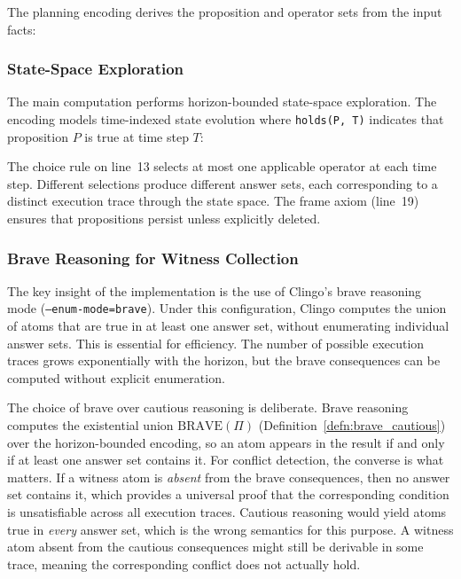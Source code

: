 The planning encoding derives the proposition and operator sets from the input facts:



\subsubsection{State-Space Exploration}

The main computation performs horizon-bounded state-space exploration. The encoding models time-indexed state evolution where \texttt{holds(P, T)} indicates that proposition $P$ is true at time step $T$:



The choice rule on line~13 selects at most one applicable operator at each time step. Different selections produce different answer sets, each corresponding to a distinct execution trace through the state space. The frame axiom (line~19) ensures that propositions persist unless explicitly deleted.

\subsubsection{Brave Reasoning for Witness Collection}
\label{sec:witness_collection}

The key insight of the implementation is the use of Clingo's brave reasoning mode (\texttt{--enum-mode=brave}). Under this configuration, Clingo computes the union of atoms that are true in at least one answer set, without enumerating individual answer sets. This is essential for efficiency. The number of possible execution traces grows exponentially with the horizon, but the brave consequences can be computed without explicit enumeration.

The choice of brave over cautious reasoning is deliberate. Brave reasoning computes the existential union $\text{BRAVE}(\Pi)$ (Definition~\ref{defn:brave_cautious}) over the horizon-bounded encoding, so an atom appears in the result if and only if at least one answer set contains it. For conflict detection, the converse is what matters. If a witness atom is \emph{absent} from the brave consequences, then no answer set contains it, which provides a universal proof that the corresponding condition is unsatisfiable across all execution traces. Cautious reasoning would yield atoms true in \emph{every} answer set, which is the wrong semantics for this purpose. A witness atom absent from the cautious consequences might still be derivable in some trace, meaning the corresponding conflict does not actually hold.

